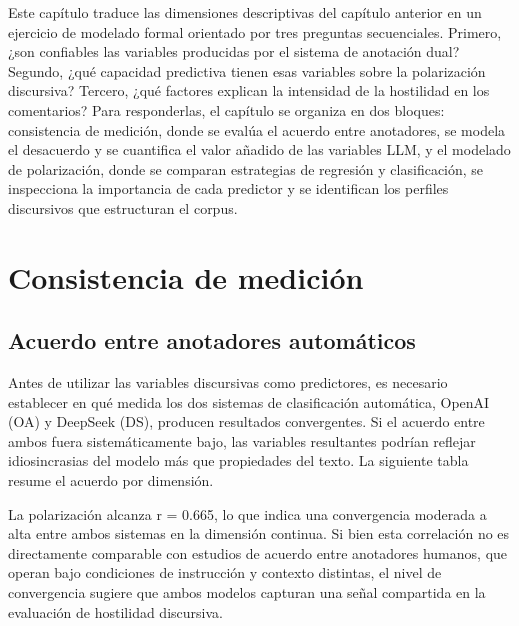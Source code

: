 \documentclass[
  letterpaper,
  numbers=noendperiod,
  fontsize=11pt,
  DIV=12,
  titlepage=false]{scrreprt}
\begin{document}
Este capítulo traduce las dimensiones descriptivas del capítulo anterior
en un ejercicio de modelado formal orientado por tres preguntas
secuenciales. Primero, ¿son confiables las variables producidas por el
sistema de anotación dual? Segundo, ¿qué capacidad predictiva tienen
esas variables sobre la polarización discursiva? Tercero, ¿qué factores
explican la intensidad de la hostilidad en los comentarios? Para
responderlas, el capítulo se organiza en dos bloques: consistencia de
medición, donde se evalúa el acuerdo entre anotadores, se modela el
desacuerdo y se cuantifica el valor añadido de las variables LLM, y el
modelado de polarización, donde se comparan estrategias de regresión y
clasificación, se inspecciona la importancia de cada predictor y se
identifican los perfiles discursivos que estructuran el corpus.

\section{Consistencia de medición}\label{consistencia-de-mediciuxf3n}

\subsection{Acuerdo entre anotadores
automáticos}\label{acuerdo-entre-anotadores-automuxe1ticos}

Antes de utilizar las variables discursivas como predictores, es
necesario establecer en qué medida los dos sistemas de clasificación
automática, OpenAI (OA) y DeepSeek (DS), producen resultados
convergentes. Si el acuerdo entre ambos fuera sistemáticamente bajo, las
variables resultantes podrían reflejar idiosincrasias del modelo más que
propiedades del texto. La siguiente tabla resume el acuerdo por
dimensión.

La polarización alcanza r = 0.665, lo que indica una convergencia
moderada a alta entre ambos sistemas en la dimensión continua. Si bien
esta correlación no es directamente comparable con estudios de acuerdo
entre anotadores humanos, que operan bajo condiciones de instrucción y
contexto distintas, el nivel de convergencia sugiere que ambos modelos
capturan una señal compartida en la evaluación de hostilidad discursiva.
\end{document}
